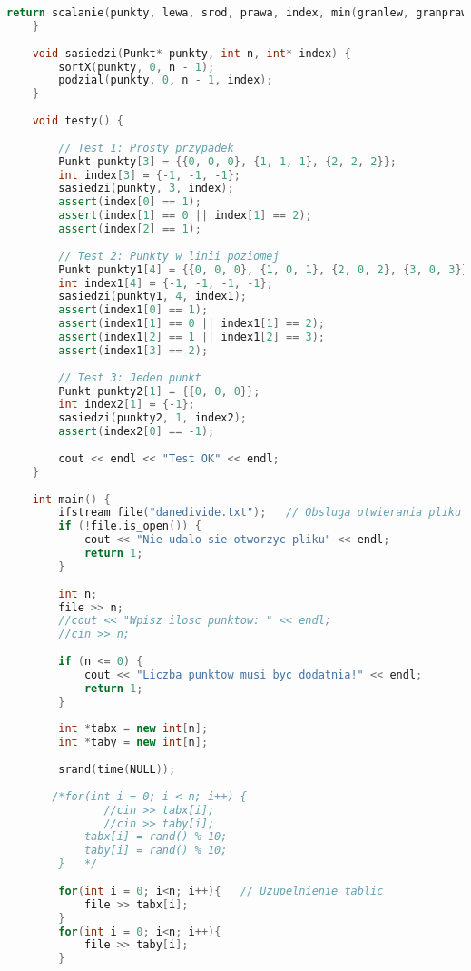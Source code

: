 \documentclass[12pt,twoside]{article}
\begin{document}
\begin{lstlisting}[language=C++,caption=Kod Dziel i Zwyciężaj,label={dividekod}]
        return scalanie(punkty, lewa, srod, prawa, index, min(granlew, granpraw));   // Wywowalanie funkcji scalanie ktora zapewni ostateczny wynik
    }
    
    void sasiedzi(Punkt* punkty, int n, int* index) {    
        sortX(punkty, 0, n - 1);
        podzial(punkty, 0, n - 1, index);
    }
    
    void testy() {
        
        // Test 1: Prosty przypadek
        Punkt punkty[3] = {{0, 0, 0}, {1, 1, 1}, {2, 2, 2}};
        int index[3] = {-1, -1, -1};
        sasiedzi(punkty, 3, index);
        assert(index[0] == 1);
        assert(index[1] == 0 || index[1] == 2);
        assert(index[2] == 1);
        
        // Test 2: Punkty w linii poziomej
        Punkt punkty1[4] = {{0, 0, 0}, {1, 0, 1}, {2, 0, 2}, {3, 0, 3}};
        int index1[4] = {-1, -1, -1, -1};
        sasiedzi(punkty1, 4, index1);
        assert(index1[0] == 1);
        assert(index1[1] == 0 || index1[1] == 2);
        assert(index1[2] == 1 || index1[2] == 3);
        assert(index1[3] == 2);
        
        // Test 3: Jeden punkt
        Punkt punkty2[1] = {{0, 0, 0}};
        int index2[1] = {-1};
        sasiedzi(punkty2, 1, index2);
        assert(index2[0] == -1);
        
        cout << endl << "Test OK" << endl;
    }
    
    int main() {
        ifstream file("danedivide.txt");   // Obsluga otwierania pliku
        if (!file.is_open()) {
            cout << "Nie udalo sie otworzyc pliku" << endl;
            return 1;
        }	
        
        int n;
        file >> n;
        //cout << "Wpisz ilosc punktow: " << endl;
        //cin >> n;
        
        if (n <= 0) {
            cout << "Liczba punktow musi byc dodatnia!" << endl;
            return 1;
        }
        
        int *tabx = new int[n];
        int *taby = new int[n];
        
        srand(time(NULL));
        
       /*for(int i = 0; i < n; i++) {
               //cin >> tabx[i];
               //cin >> taby[i];
            tabx[i] = rand() % 10;
            taby[i] = rand() % 10;
        }   */
    
        for(int i = 0; i<n; i++){   // Uzupelnienie tablic
            file >> tabx[i];
        }
        for(int i = 0; i<n; i++){
            file >> taby[i];
        }
    

\end{lstlisting}
\end{document}
